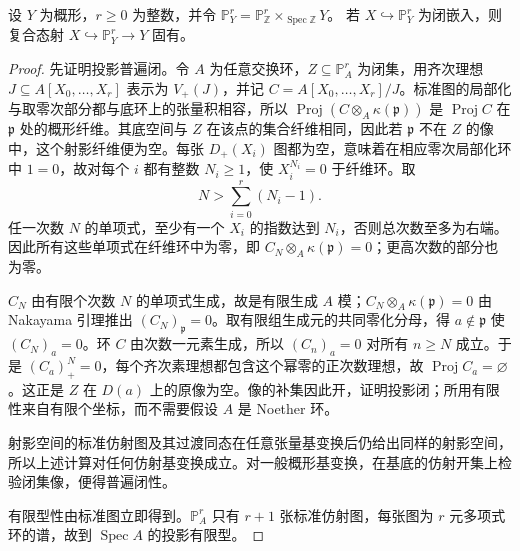 \begin{theorem}[射影空间闭子概形的固有性]\label{b3:thm:closed-projective-proper}
	设 \(Y\) 为概形，\(r\ge0\) 为整数，并令 \(\mathbb P_Y^r=\mathbb P_{\mathbb Z}^r\times_{\operatorname{Spec}\mathbb Z}Y\)。 若 \(X\hookrightarrow\mathbb P_Y^r\) 为闭嵌入，则复合态射 \(X\hookrightarrow\mathbb P_Y^r\rightarrow Y\) 固有。
\end{theorem}
\begin{proof}
	先证明投影普遍闭。令 \(A\) 为任意交换环，\(Z\subseteq\mathbb P_A^r\) 为闭集，用齐次理想 \(J\subseteq A[X_0,\ldots,X_r]\) 表示为 \(V_+(J)\)，并记 \(C=A[X_0,\ldots,X_r]/J\)。标准图的局部化与取零次部分都与底环上的张量积相容，所以 \(\operatorname{Proj}(C\otimes_A\kappa(\mathfrak p))\) 是 \(\operatorname{Proj}C\) 在 \(\mathfrak p\) 处的概形纤维。其底空间与 \(Z\) 在该点的集合纤维相同，因此若 \(\mathfrak p\) 不在 \(Z\) 的像中，这个射影纤维便为空。每张 \(D_+(X_i)\) 图都为空，意味着在相应零次局部化环中 \(1=0\)，故对每个 \(i\) 都有整数 \(N_i\ge1\)，使 \(X_i^{N_i}=0\) 于纤维环。取
	\[
		N>\sum_{i=0}^r(N_i-1).
	\]
	任一次数 \(N\) 的单项式，至少有一个 \(X_i\) 的指数达到 \(N_i\)，否则总次数至多为右端。因此所有这些单项式在纤维环中为零，即 \(C_N\otimes_A\kappa(\mathfrak p)=0\)；更高次数的部分也为零。

	\(C_N\) 由有限个次数 \(N\) 的单项式生成，故是有限生成 \(A\) 模；\(C_N\otimes_A\kappa(\mathfrak p)=0\) 由 Nakayama 引理推出 \((C_N)_{\mathfrak p}=0\)。取有限组生成元的共同零化分母，得 \(a\notin\mathfrak p\) 使 \((C_N)_a=0\)。环 \(C\) 由次数一元素生成，所以 \((C_n)_a=0\) 对所有 \(n\ge N\) 成立。于是 \((C_a)_+^N=0\)，每个齐次素理想都包含这个幂零的正次数理想，故 \(\operatorname{Proj}C_a=\varnothing\)。这正是 \(Z\) 在 \(D(a)\) 上的原像为空。像的补集因此开，证明投影闭；所用有限性来自有限个坐标，而不需要假设 \(A\) 是 Noether 环。

	射影空间的标准仿射图及其过渡同态在任意张量基变换后仍给出同样的射影空间，所以上述计算对任何仿射基变换成立。对一般概形基变换，在基底的仿射开集上检验闭集像，便得普遍闭性。

	有限型性由标准图立即得到。\(\mathbb P_A^r\) 只有 \(r+1\) 张标准仿射图，每张图为 \(r\) 元多项式环的谱，故到 \(\operatorname{Spec}A\) 的投影有限型。


\end{proof}

